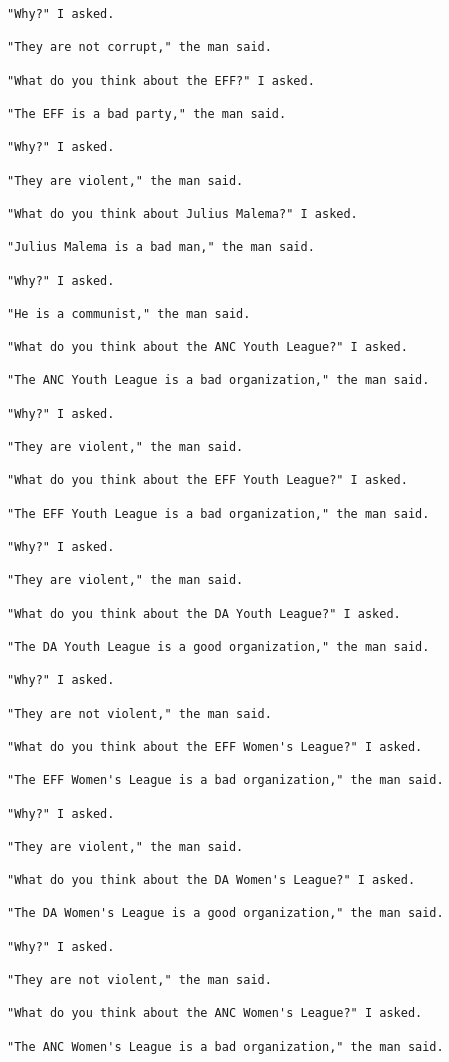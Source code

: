 \begin{lstlisting}
"Why?" I asked.

"They are not corrupt," the man said.

"What do you think about the EFF?" I asked.

"The EFF is a bad party," the man said.

"Why?" I asked.

"They are violent," the man said.

"What do you think about Julius Malema?" I asked.

"Julius Malema is a bad man," the man said.

"Why?" I asked.

"He is a communist," the man said.

"What do you think about the ANC Youth League?" I asked.

"The ANC Youth League is a bad organization," the man said.

"Why?" I asked.

"They are violent," the man said.

"What do you think about the EFF Youth League?" I asked.

"The EFF Youth League is a bad organization," the man said.

"Why?" I asked.

"They are violent," the man said.

"What do you think about the DA Youth League?" I asked.

"The DA Youth League is a good organization," the man said.

"Why?" I asked.

"They are not violent," the man said.

"What do you think about the EFF Women's League?" I asked.

"The EFF Women's League is a bad organization," the man said.

"Why?" I asked.

"They are violent," the man said.

"What do you think about the DA Women's League?" I asked.

"The DA Women's League is a good organization," the man said.

"Why?" I asked.

"They are not violent," the man said.

"What do you think about the ANC Women's League?" I asked.

"The ANC Women's League is a bad organization," the man said.


\end{lstlisting}
